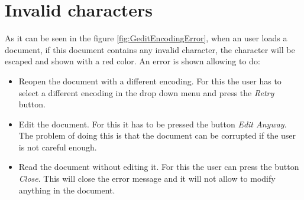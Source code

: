 
\chapter{Invalid characters}


As it can be seen in the figure \ref{fig:GeditEncodingError}, when an user loads a document, if this document contains any invalid character, the character will be escaped and shown with a red color. An error is shown allowing to do:
\begin{itemize}
  \item Reopen the document with a different encoding. For this the user has to select a different encoding in the drop down menu and press the \emph{Retry} button.
  \item Edit the document. For this it has to be pressed the button \emph{Edit Anyway}. The problem of doing this is that the document can be corrupted if the user is not careful enough.
  \item Read the document without editing it. For this the user can press the button \emph{Close}. This will close the error message and it will not allow to modify anything in the document.
\end{itemize}
